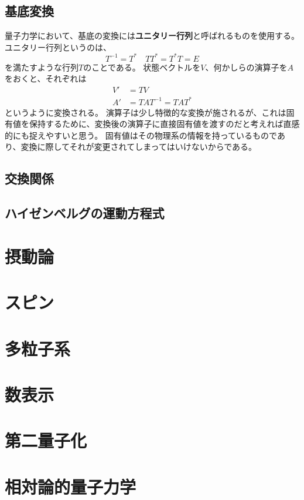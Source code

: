 \documentclass[a4paper]{jsreport}
\begin{document}
        \section{基底変換}
            量子力学において、基底の変換には\textbf{ユニタリー行列}と呼ばれるものを使用する。
            ユニタリー行列というのは、
            \begin{equation}
                T^{-1} = T^\ast \quad  TT^\ast = T^\ast T = E
            \end{equation}
            を満たすような行列$T$のことである。
            状態ベクトルを$V$、何かしらの演算子を$A$をおくと、それぞれは
            \begin{align}
                V' &= TV \\
                A' &= TAT^{-1} = TAT^\ast
            \end{align}
            というように変換される。
            演算子は少し特徴的な変換が施されるが、これは固有値を保持するために、変換後の演算子に直接固有値を渡すのだと考えれば直感的にも捉えやすいと思う。
            固有値はその物理系の情報を持っているものであり、変換に際してそれが変更されてしまってはいけないからである。

        \section{交換関係}

        \section{ハイゼンベルグの運動方程式}

    \chapter{摂動論}
    \chapter{スピン}
    \chapter{多粒子系}
    \chapter{数表示}
    \chapter{第二量子化}
    \chapter{相対論的量子力学}
        
\end{document}
